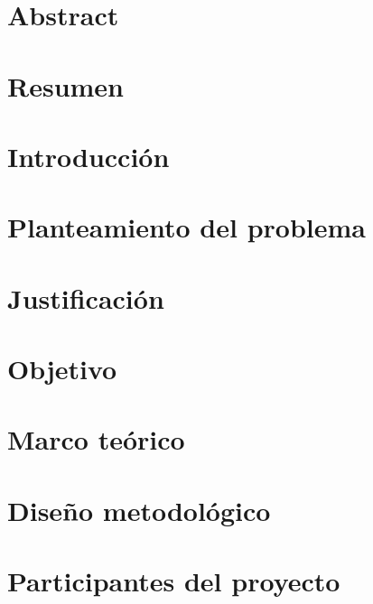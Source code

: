 \documentclass[stu, 12pt, noextraspace, floatsintext]{apa7}
\begin{document}
\setcounter{page}{3} %

\renewcommand{\contentsname}{Índice general}
\tableofcontents %

\clearpage
\listoffigures %

\clearpage
\listoftables

\clearpage
\section*{Abstract} %


\clearpage
\section*{Resumen} %


\clearpage
\section{Introducción}


\clearpage
\section{Planteamiento del problema}


\clearpage
\section{Justificación}


\clearpage
\section{Objetivo}


\clearpage
\section{Marco teórico}


\clearpage
\section{Diseño metodológico}


\clearpage
\section{Participantes del proyecto}

\end{document}
